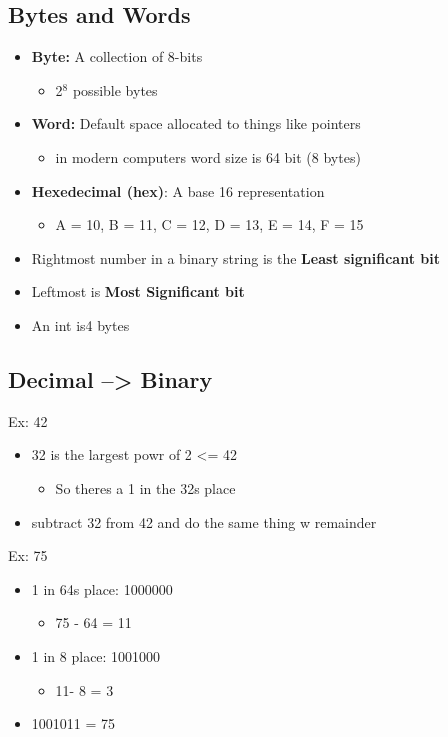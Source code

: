 \documentclass[11pt]{article}
\begin{document}
\subsection{Bytes and Words}
\label{sec-2-2}
\begin{itemize}
\item \textbf{Byte:} A collection of 8-bits
\begin{itemize}
\item 2$^{\text{8}}$ possible bytes
\end{itemize}
\item \textbf{Word:} Default space allocated to things like pointers
\begin{itemize}
\item in modern computers word size is 64 bit (8 bytes)
\end{itemize}
\item \textbf{Hexedecimal (hex)}: A base 16 representation
\begin{itemize}
\item A = 10, B = 11, C = 12, D = 13, E = 14, F = 15
\end{itemize}
\item Rightmost number in a binary string is the \textbf{Least significant bit}
\item Leftmost is \textbf{Most Significant bit}
\item An int is4 bytes
\end{itemize}

\subsection{Decimal --> Binary}
\label{sec-2-3}
Ex: 42
\begin{itemize}
\item 32 is the largest powr of 2 <= 42
\begin{itemize}
\item So theres a 1 in the 32s place
\end{itemize}
\item subtract 32 from 42 and do the same thing w remainder
\end{itemize}

Ex: 75
\begin{itemize}
\item 1 in 64s place: 1000000
\begin{itemize}
\item 75 - 64 = 11
\end{itemize}
\item 1 in 8 place: 1001000
\begin{itemize}
\item 11- 8 = 3
\end{itemize}
\item 1001011 = 75
\end{itemize}
\end{document}
